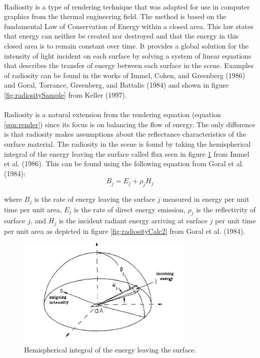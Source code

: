 \paragraph{}
Radiosity is a type of rendering technique that was adapted for use in computer graphics from the thermal engineering field.  The method is based on the fundamental Law of Conservation of Energy within a closed area.  This law states that energy can neither be created nor destroyed and that the energy in this closed area is to remain constant over time.  It provides a global solution for the intensity of light incident on each surface by solving a system of linear equations that describes the transfer of energy between each surface in the scene.  Examples of radiosity can be found in the works of Immel, Cohen, and Greenberg (1986) and Goral, Torrance, Greenberg, and Battalie (1984) and shown in figure \ref{fig:radiositySample} from Keller (1997).

\paragraph{}
Radiosity is a natural extension from the rendering equation (equation \ref{eqn:render}) since its focus is on balancing the flow of energy.  The only difference is that radiosity makes assumptions about the reflectance characteristics of the surface material.  The radiosity in the scene is found by taking the hemispherical integral of the energy leaving the surface called flux seen in figure \ref{fig:radiosityCalc1} from Immel et al. (1986).  This can be found using the following equation from Goral et al. (1984):
\begin{equation}
B_{j} = E_{j} + \rho_{j}H_{j} \label{eqn:radiosity1}
\end{equation}

where $B_{j}$ is the rate of energy leaving the surface $j$ measured in energy per unit time per unit area, $E_{j}$ is the rate of direct energy emission,  $\rho_{j}$ is the reflectivity of surface $j$, and $H_{j}$ is the incident radiant energy arriving at surface $j$ per unit time per unit area as depicted in figure \ref{fig:radiosityCalc2} from Goral et al. (1984).

\begin{figure}[h!]
  \centering
    \includegraphics[width=0.75\textwidth]{radiosityCalc1.jpg}
  \caption{Hemispherical integral of the energy leaving the surface.}
	\label{fig:radiosityCalc1}
\end{figure}

